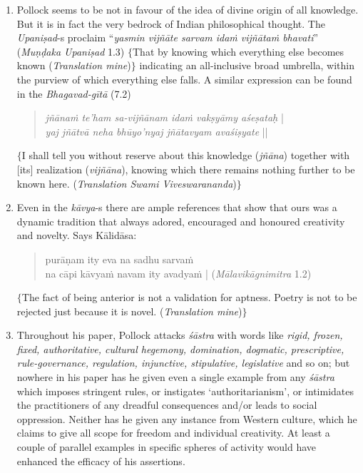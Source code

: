 \begin{enumerate}
\item Pollock seems to be not in favour of the idea of divine origin of all knowledge. But it is in fact the very bedrock of Indian philosophical thought. The {\it Upaniṣad}-s proclaim ``\textsl{yasmin vijñāte sarvam idaṁ vijñātaṁ bhavati}'' (\textsl{Muṇḍaka Upaniṣad} 1.3) $\{$That by knowing which everything else becomes known (\textsl{Translation mine})$\}$ indicating an all-inclusive broad umbrella, within the purview of which everything else falls. A similar expression can be found in the \textsl{Bhagavad-gītā} (7.2)
\begin{quote}
{{\sl jñānaṁ te'ham sa-vijñānam idaṁ vakṣyāmy aśeṣataḥ}} |\\
{\sl yaj jñātvā neha bhūyo'nyaj jñātavyam avaśiṣyate} ||
\end{quote}
$\{$I shall tell you without reserve about this knowledge ({\it jñāna}) together with [its] realization ({\it vijñāna}), knowing which there remains nothing further to be known here. ({\em Translation Swami Viveswarananda})$\}$

\item Even in the {\it kāvya}-s there are ample references that show that ours was a dynamic tradition that always adored, encouraged and honoured creativity and novelty. Says Kālidāsa:
\begin{quote}
purāṇam ity eva na sadhu sarvaṁ\\
na cāpi kāvyaṁ navam ity avadyaṁ | (\textsl{Mālavikāgnimitra}  1.2)
\end{quote}
$\{$The fact of being anterior is not a validation for aptness. Poetry is not to be rejected just because it is novel. (\textsl{Translation mine})$\}$

\item Throughout his paper, Pollock attacks {\it śāstra} with words like \textsl{rigid, frozen, fixed, authoritative, cultural hegemony, domination, dogmatic, prescriptive, rule-governance, regulation, injunctive, stipulative, legislative} and so on; but nowhere in his paper has he given even a single example from any {\it śāstra} which imposes stringent rules, or instigates `authoritarianism', or intimidates the practitioners of any dreadful consequences and/or leads to social oppression. Neither has he given any instance from Western culture, which he claims to give all scope for freedom and individual creativity. At least a couple of parallel examples in specific spheres of activity would have enhanced the efficacy of his assertions.


\end{enumerate}
